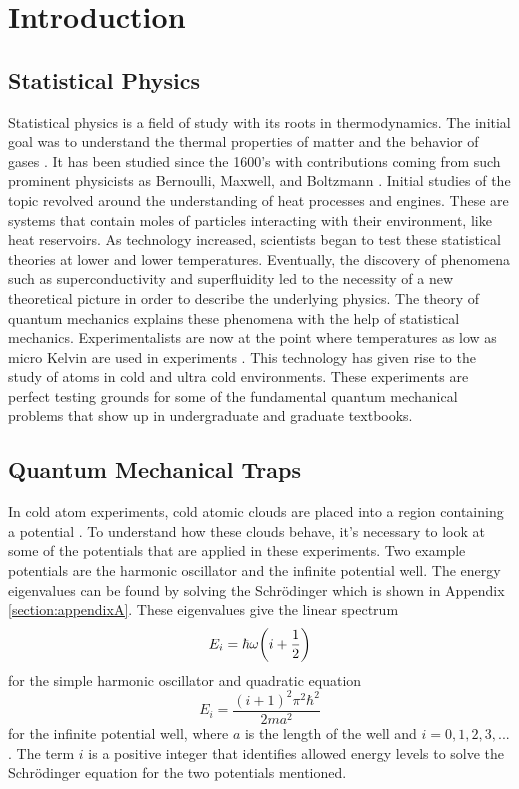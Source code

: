 \chapter{Introduction} \label{ch:introduction}
\section{Statistical Physics}
Statistical physics is a field of study with its roots in thermodynamics. The initial goal was to understand the thermal properties of matter and the behavior of gases \cite{Kardar}. It has been studied since the 1600's with contributions coming from such prominent physicists as Bernoulli, Maxwell, and Boltzmann \cite{Flamm1998}. Initial studies of the topic  revolved around the understanding of heat processes and engines. These are systems that contain moles of particles interacting with their environment, like heat reservoirs. As technology increased, scientists began to test these statistical theories at lower and lower temperatures. Eventually, the discovery of phenomena such as superconductivity and superfluidity led to the necessity of a new theoretical picture in order to describe the underlying physics. The theory of quantum mechanics explains these phenomena with the help of statistical mechanics. Experimentalists are now at the point where temperatures as low as micro Kelvin are used in experiments \cite{Onofrio2016, Es2010,Bhar}. This technology has given rise to the study of atoms in cold and ultra cold environments. These experiments are perfect testing grounds for some of the fundamental quantum mechanical problems that show up in undergraduate and graduate textbooks. 

\section{Quantum Mechanical Traps} \label{section:QMtraps}
In cold atom experiments, cold atomic clouds are placed into a region containing a potential \cite{Bhar}. To understand how these clouds behave, it's necessary to look at some of the potentials that are applied in these experiments. Two example potentials are the harmonic oscillator and the infinite potential well. The energy eigenvalues can be found by solving the Schr\"odinger which is shown in Appendix \ref{section:appendixA}. These eigenvalues give the linear spectrum 
\begin{equation}
    E_i=\hbar\omega\qty(i+\frac{1}{2}) \label{SHOpot}
\end{equation}
for the simple harmonic oscillator and quadratic equation 
\begin{equation}
    E_i=\frac{(i+1)^2\pi^2\hbar^2}{2ma^2} \label{quadpot}
\end{equation}
for the infinite potential well, where $a$ is the length of the well and $i=0,1,2,3,...$. The term $i$ is a positive integer that identifies allowed energy levels to solve the Schr\"odinger equation for the two potentials mentioned.

